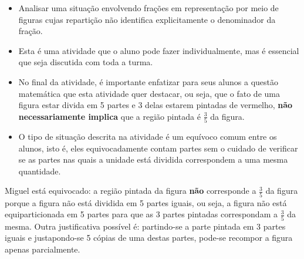 \begin{multicols}{2}
  \begin{objetivos}{}{}
  \begin{itemize} %
    \item       Analisar uma situação envolvendo frações em representação por meio de figuras cujas repartição não identifica explicitamente o denominador da fração.
\end{itemize} %
\end{objetivos}

\begin{orientacoes}
\begin{itemize} %
    \item       Esta é uma atividade que o aluno pode fazer individualmente, mas é essencial que seja discutida com toda a turma.
    \item       No final da atividade, é importante enfatizar para seus alunos a questão matemática que esta atividade quer destacar, ou seja, que o fato de uma figura estar divida em 5 partes e 3 delas estarem pintadas de vermelho,       {\bf não necessariamente implica}       que a região pintada é       $\frac{3}{5}$ da figura.
    \item       O tipo de situação descrita na atividade é um equívoco comum entre os alunos, isto é, eles equivocadamente contam partes sem o cuidado de verificar se as partes nas quais a unidade está dividida correspondem a uma mesma quantidade.
\end{itemize} %


\end{orientacoes}

\begin{solucao}{}{}
Miguel está equivocado: a região pintada da figura   {\bf não}   corresponde a   $\frac{3}{5}$ da figura porque a figura não está dividida em 5 partes iguais, ou seja, a figura não está equiparticionada em 5 partes para que as 3 partes pintadas correspondam a   $\frac{3}{5}$ da mesma. Outra justificativa possível é: partindo-se a parte pintada em 3 partes iguais e justapondo-se 5 cópias de uma destas partes, pode-se recompor a figura apenas parcialmente.


\end{solucao}
\end{multicols}
